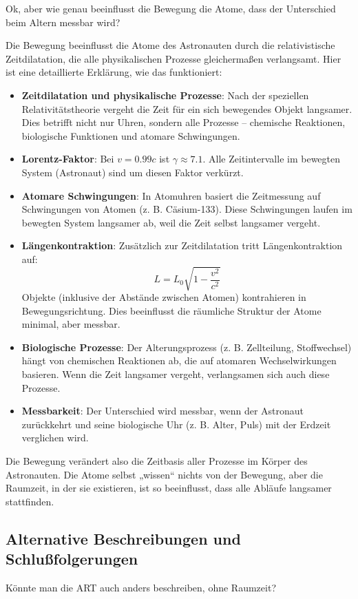 \documentclass[a4paper,12pt]{article}
\begin{document}
	Ok, aber wie genau beeinflusst die Bewegung die Atome, dass der Unterschied beim Altern messbar wird?
	
	Die Bewegung beeinflusst die Atome des Astronauten durch die relativistische Zeitdilatation, die alle physikalischen Prozesse gleichermaßen verlangsamt. Hier ist eine detaillierte Erklärung, wie das funktioniert:
	
	\begin{itemize}
		\item \textbf{Zeitdilatation und physikalische Prozesse}: Nach der speziellen Relativitätstheorie vergeht die Zeit für ein sich bewegendes Objekt langsamer. Dies betrifft nicht nur Uhren, sondern alle Prozesse – chemische Reaktionen, biologische Funktionen und atomare Schwingungen.
		\item \textbf{Lorentz-Faktor}: Bei \( v = 0.99c \) ist \( \gamma \approx 7.1 \). Alle Zeitintervalle im bewegten System (Astronaut) sind um diesen Faktor verkürzt.
		\item \textbf{Atomare Schwingungen}: In Atomuhren basiert die Zeitmessung auf Schwingungen von Atomen (z. B. Cäsium-133). Diese Schwingungen laufen im bewegten System langsamer ab, weil die Zeit selbst langsamer vergeht.
		\item \textbf{Längenkontraktion}: Zusätzlich zur Zeitdilatation tritt Längenkontraktion auf:
		\[ 
		L = L_0 \sqrt{1 - \frac{v^2}{c^2}}
	\]
	Objekte (inklusive der Abstände zwischen Atomen) kontrahieren in Bewegungsrichtung. Dies beeinflusst die räumliche Struktur der Atome minimal, aber messbar.
	\item \textbf{Biologische Prozesse}: Der Alterungsprozess (z. B. Zellteilung, Stoffwechsel) hängt von chemischen Reaktionen ab, die auf atomaren Wechselwirkungen basieren. Wenn die Zeit langsamer vergeht, verlangsamen sich auch diese Prozesse.
	\item \textbf{Messbarkeit}: Der Unterschied wird messbar, wenn der Astronaut zurückkehrt und seine biologische Uhr (z. B. Alter, Puls) mit der Erdzeit verglichen wird.
\end{itemize}

Die Bewegung verändert also die Zeitbasis aller Prozesse im Körper des Astronauten. Die Atome selbst „wissen“ nichts von der Bewegung, aber die Raumzeit, in der sie existieren, ist so beeinflusst, dass alle Abläufe langsamer stattfinden.

\subsection{Alternative Beschreibungen und Schlußfolgerungen}
Könnte man die ART auch anders beschreiben, ohne Raumzeit?
\end{document}
